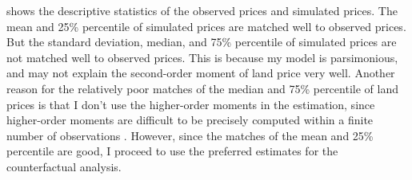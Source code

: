
 shows the descriptive statistics of the observed prices
and simulated prices.
The mean and 25\% percentile of simulated prices are matched well to observed prices.
But the standard deviation, median, and 75\% percentile of simulated prices are not matched well to
observed prices. This is because my model is parsimonious, and
may not explain the second-order moment of land price very well.
Another reason for the relatively poor matches of the median and 75\% percentile of land prices
is that I don't use the higher-order moments
in the estimation, since higher-order moments are difficult to be precisely computed within
a finite number of observations \citep{adda2003dynamic}. However, since the matches of the
mean and 25\% percentile are good, I proceed to use the preferred estimates
for the counterfactual analysis.


